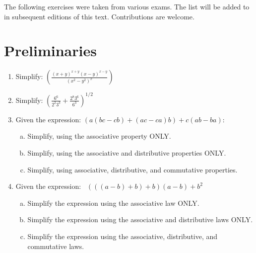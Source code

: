 
The following exercises were taken from various exams. The list will be added to in subsequent editions of this text.  Contributions are welcome.


\section{Preliminaries}
\begin{enumerate}[(1)]
\item
Simplify:
$\displaystyle{ \left(\frac{(x+y)^{x+y}(x-y)^{x-y}}{(x^2 - y^2)^x}\right)}$
\item
Simplify:
$ \displaystyle{\left( \frac{6^6}{2^2 3^3} +  \frac{2^8 3^6}{6^3}\right)^{1/2}} $
\item
Given the expression:  $( a(bc - cb) + (ac - ca)b) + c(ab - ba)$:
\begin{enumerate}[(a)]
\item
Simplify, using the associative property ONLY.
\item
Simplify, using the associative and distributive properties ONLY.
\item
Simplify, using associative, distributive, and commutative properties.
\end{enumerate}

\item
Given the expression:~
 $(((a-b)+b)+b)(a-b) + b^2$
\begin{enumerate}[(a)]
\item
Simplify the expression using the associative law ONLY.
\item
Simplify the expression using the associative and distributive laws ONLY.
\item
Simplify the expression using the associative, distributive, and commutative laws.
\end{enumerate}



\end{enumerate}
